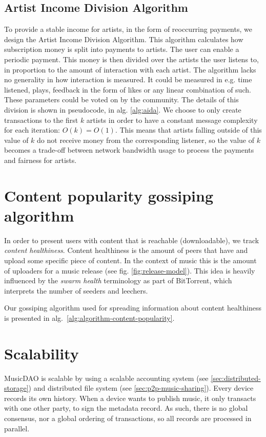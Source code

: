 \subsection{Artist Income Division Algorithm}
\label{sec:aida-design}
To provide a stable income for artists, in the form of reoccurring payments, we design the Artist Income Division Algorithm. This algorithm calculates how subscription money is split into payments to artists. The user can enable a periodic payment. This money is then divided over the artists the user listens to, in proportion to the amount of interaction with each artist. The algorithm lacks no generality in how interaction is measured. It could be measured in e.g. time listened, plays, feedback in the form of likes or any linear combination of such. These parameters could be voted on by the community. The details of this division is shown in pseudocode, in alg. \ref{alg:aida}. We choose to only create transactions to the first $k$ artists in order to have a constant message complexity for each iteration: $O(k) = O(1)$. This means that artists falling outside of this value of $k$ do not receive money from the corresponding listener, so the value of $k$ becomes a trade-off between network bandwidth usage to process the payments and fairness for artists.



\section{Content popularity gossiping algorithm}
In order to present users with content that is reachable (downloadable), we track \textit{content healthiness}. Content healthiness is the amount of peers that have and upload some specific piece of content. In the context of music this is the amount of uploaders for a music release (see fig. \ref{fig:release-model}). This idea is heavily influenced by the \textit{swarm health} terminology as part of BitTorrent, which interprets the number of seeders and leechers.


Our gossiping algorithm used for spreading information about content healthiness is presented in alg.~\ref{alg:algorithm-content-popularity}.



\section{Scalability}
MusicDAO is scalable by using a scalable accounting system (see \ref{sec:distributed-storage}) and distributed file system (see \ref{sec:p2p-music-sharing}). Every device records its own history. When a device wants to publish music, it only transacts with one other party, to sign the metadata record. As such, there is no global consensus, nor a global ordering of transactions, so all records are processed in parallel.

